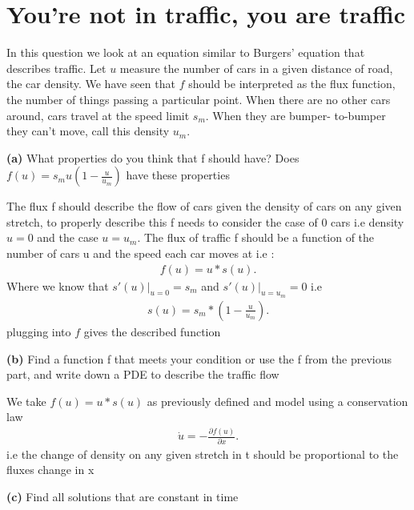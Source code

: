 \section{You're not in traffic, you are traffic}
In this question we look at an equation similar to Burgers’ equation that describes traffic. Let
$u$ measure the number of cars in a given distance of road, the car density. We have seen that
$f$ should be interpreted as the flux function, the number of things passing a particular point.
When there are no other cars around, cars travel at the speed limit $s_m$. When they are bumper-
to-bumper they can’t move, call this density $u_m$.
\begin{question}
  \textbf{(a)} What properties do you think that f should have? Does $f(u)= s_m u (1-\frac{u}{u_m})$ have these properties 
\end{question}
\begin{solution}
 The flux f should describe the flow of cars given the density of cars on any given stretch, 
 to properly describe this f needs to consider the case of 0 cars i.e density $u=0$  and the case $u=u_m$.
 The flux of traffic f should be a function of the number of cars u and the speed each car moves at i.e : 
 \begin{align*}
  f(u)= u*s(u)
 .\end{align*}
 Where we know that $s'(u)\rvert_{u=0} = s_m$ and $s'(u) \rvert_{u=u_m} = 0$ i.e 
 \begin{align*}
  s(u)  = s_m * (1- \frac{u}{u_m})
 .\end{align*}
plugging into $f$ gives the described function
\end{solution}
\begin{question}
  \textbf{(b)}  Find a function f that meets your condition or use the f from the previous part, and write down a PDE to describe the traffic flow
\end{question}
\begin{solution}
  We take $f(u)=u*s(u)$ as previously defined and model using a conservation law 
  \begin{align*}
    \dot{u}   = -\frac{\partial f(u)}{\partial x} 
  .\end{align*}
  i.e the change of density on any given stretch  in t should be proportional to the fluxes change in x 
\end{solution}
\begin{question}
  \textbf{(c)}  Find all solutions that are constant in time 
\end{question}

